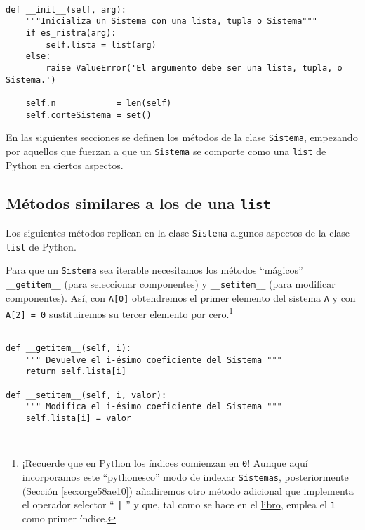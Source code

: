 \documentclass[11pt]{report}
\begin{document}
\begin{verbatim}

def __init__(self, arg):
    """Inicializa un Sistema con una lista, tupla o Sistema"""                        
    if es_ristra(arg):
        self.lista = list(arg)
    else:
        raise ValueError('El argumento debe ser una lista, tupla, o Sistema.')

    self.n            = len(self)
    self.corteSistema = set()

\end{verbatim}

En las siguientes secciones se definen los métodos de la clase
\texttt{Sistema}, empezando por aquellos que fuerzan a que un \texttt{Sistema} se
comporte como una \texttt{list} de Python en ciertos aspectos.

\medskip

\subsection{Métodos similares a los de una \texttt{list}}
\label{sec:org1e84f8f}
       Los siguientes métodos replican en la clase \texttt{Sistema} algunos aspectos
de la clase \texttt{list} de Python.

Para que un \texttt{Sistema} sea iterable necesitamos los métodos
``mágicos'' \texttt{\_\_getitem\_\_} (para seleccionar componentes) y
\texttt{\_\_setitem\_\_} (para modificar componentes).  Así, con \texttt{A[0]}
obtendremos el primer elemento del sistema \texttt{A} y con \texttt{A[2] = 0}
sustituiremos su tercer elemento por cero.\footnote{¡Recuerde que en
Python los índices comienzan en \texttt{0}!  Aunque aquí incorporamos este
``pythonesco'' modo de indexar \texttt{Sistemas}, posteriormente (Sección
\ref{sec:orge58ae10}) añadiremos otro método adicional que implementa el operador
selector `` \texttt{|} '' y que, tal como se hace en el \href{https://mbujosab.github.io/CursoDeAlgebraLineal/libro.pdf\#chapter.1}{libro}, emplea el \texttt{1}
como primer índice.}

\begin{verbatim}

def __getitem__(self, i):
    """ Devuelve el i-ésimo coeficiente del Sistema """
    return self.lista[i]

def __setitem__(self, i, valor):
    """ Modifica el i-ésimo coeficiente del Sistema """
    self.lista[i] = valor
        
\end{verbatim}
\end{document}
